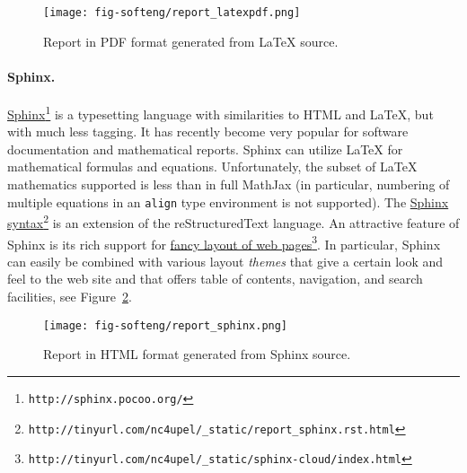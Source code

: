 \documentclass[graybox,sectrefs,envcountresetchap,open=right,final]{svmonodo}
\begin{document}
\begin{figure}[!ht]  %
  \centerline{\texttt{[image: fig-softeng/report\_latexpdf.png]}}
  \caption{
  Report in PDF format generated from {\LaTeX} source. \label{softeng1:exper:report:fig:latex}
  }
\end{figure}



\paragraph{Sphinx.}

\href{{http://sphinx.pocoo.org/}}{Sphinx}\footnote{\texttt{http://sphinx.pocoo.org/}} is a typesetting language with
similarities to HTML and {\LaTeX}, but with much less tagging. It has
recently become very popular for software documentation and
mathematical reports. Sphinx can utilize {\LaTeX} for mathematical
formulas and equations. Unfortunately, the
subset of {\LaTeX} mathematics supported is less than in full MathJax (in
particular, numbering of multiple equations in an \texttt{align} type
environment is not supported).  The \href{{http://tinyurl.com/nc4upel/_static/report_sphinx.rst.html}}{Sphinx syntax}\footnote{\texttt{http://tinyurl.com/nc4upel/\_static/report\_sphinx.rst.html}} is an extension of
the reStructuredText language. An attractive feature of Sphinx is its
rich support for \href{{http://tinyurl.com/nc4upel/_static/sphinx-cloud/index.html}}{fancy layout of web pages}\footnote{\texttt{http://tinyurl.com/nc4upel/\_static/sphinx-cloud/index.html}}. In particular,
Sphinx can easily be combined with various layout \emph{themes} that give a
certain look and feel to the web site and that offers table of
contents, navigation, and search facilities, see Figure~\ref{softeng1:exper:report:fig:sphinx}.


\begin{figure}[!ht]  %
  \centerline{\texttt{[image: fig-softeng/report\_sphinx.png]}}
  \caption{
  Report in HTML format generated from Sphinx source. \label{softeng1:exper:report:fig:sphinx}
  }
\end{figure}


\end{document}
